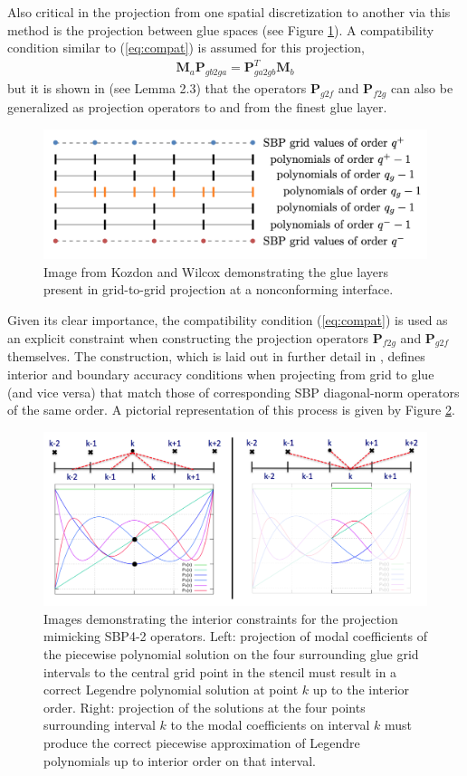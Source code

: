 Also critical in the projection from one spatial discretization to another via this
method is the projection between glue spaces (see Figure \ref{fig:glue_layers}). A
compatibility condition similar to (\ref{eq:compat}) is assumed for this projection,
\begin{align}
	\pmb{M}_{a}\pmb{P}_{gb2ga} = \pmb{P}_{ga2gb}^{T}\pmb{M}_{b} \label{eq:compat_glues}
\end{align}
but it is shown in \cite{kozdon2016stable} (see Lemma 2.3) that the operators $\pmb{P}_{g2f}$ and
$\pmb{P}_{f2g}$ can also be generalized as projection operators to and from the finest
glue layer.
\begin{figure}
\centering
\includegraphics[width=0.8\linewidth,trim=4 4 4 4,clip]{figures/glue_layers.png}
\caption{Image from Kozdon and Wilcox \cite{kozdon2016stable} demonstrating the glue
         layers present in grid-to-grid projection at a nonconforming interface.}
\label{fig:glue_layers}
\end{figure}
Given its clear importance, the compatibility condition (\ref{eq:compat}) is used as an explicit
constraint when constructing the projection operators $\pmb{P}_{f2g}$ and $\pmb{P}_{g2f}$
themselves. The construction, which is laid out in further detail in \cite{kozdon2016stable},
defines interior and boundary accuracy conditions when projecting from grid to glue
(and vice versa) that match those of corresponding SBP diagonal-norm operators of the
same order. A pictorial representation of this process is given by Figure \ref{fig:projection_layout}.
\begin{figure}
\centering
\includegraphics[width=0.9\linewidth,trim=4 4 4 4,clip]{figures/projection_layout.png}
\caption{Images demonstrating the interior constraints for the projection mimicking SBP4-2
	 operators. Left: projection of modal coefficients of the piecewise polynomial solution
	 on the four surrounding glue grid intervals to the central grid point in the stencil must
	 result in a correct Legendre polynomial solution at point $k$ up to the interior order.
	 Right: projection of the solutions at the four points surrounding interval $k$ to the
	 modal coefficients on interval $k$ must produce the correct piecewise approximation of
	 Legendre polynomials up to interior order on that interval.}
\label{fig:projection_layout}
\end{figure}
